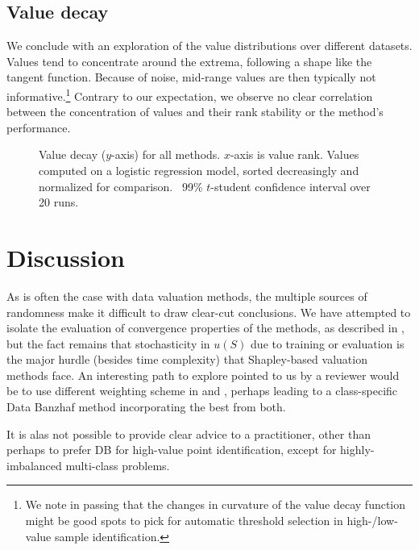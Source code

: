 \documentclass[10pt]{article}
\begin{document}
\subsection{Value decay}\label{sec:value-decay}

We conclude with an exploration of the value distributions over different
datasets. Values tend to concentrate around the extrema, following a shape
like the tangent function. Because of noise, mid-range values are then
typically not informative.\footnote{We note in passing that the changes in
curvature of the value decay function might be good spots to pick for
automatic threshold selection in high-/low-value sample identification.}
Contrary to our expectation, we observe no clear correlation between the
concentration of values and their rank stability or the method's performance.

\begin{figure}[h]
  \caption{\label{fig:value-decay}Value decay ($y$-axis) for all methods.
  $x$-axis is value rank. Values computed on a logistic regression model,
  sorted decreasingly and normalized for comparison. \ 99\% $t$-student
  confidence interval over 20 runs.}
\end{figure}

\section{Discussion}

As is often the case with data valuation methods, the multiple sources of
randomness make it difficult to draw clear-cut conclusions. We have attempted
to isolate the evaluation of convergence properties of the methods, as
described in , but the fact remains that
stochasticity in $u (S)$ due to training or evaluation is the major hurdle
(besides time complexity) that Shapley-based valuation methods face. An
interesting path to explore pointed to us by a reviewer would be to use
different weighting scheme in  and
, perhaps leading to a class-specific Data Banzhaf method
incorporating the best from both.

It is alas not possible to provide clear advice to a practitioner, other than
perhaps to prefer DB for high-value point identification, except for
highly-imbalanced multi-class problems.
\end{document}

